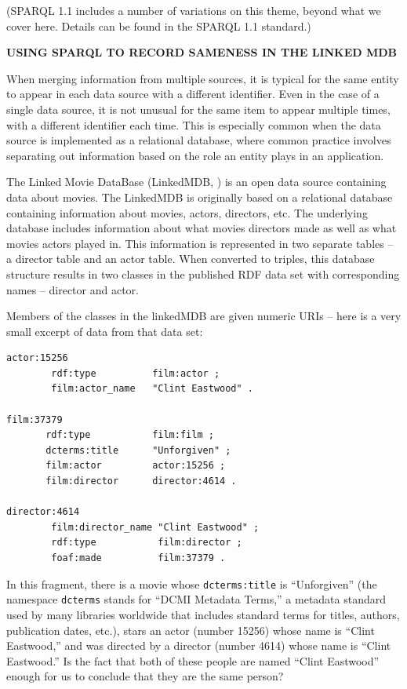 (SPARQL 1.1 includes a number of variations on this theme, beyond what
we cover here. Details can be found in the SPARQL 1.1 standard.)

\begin{challenge} 
\textbf{USING SPARQL TO RECORD SAMENESS IN THE LINKED MDB}
\label{chal:3}

When merging information from multiple sources, it is typical for the
same entity to appear in each data source with a different identifier.
Even in the case of a single data source, it is not unusual for the same
item to appear multiple times, with a different identifier each time.
This is especially common when the data source is implemented as a
relational database, where common practice involves separating out
information based on the role an entity plays in an application.

The Linked Movie DataBase (LinkedMDB, \cite{lmdatabase}) is an open data source containing
data about movies. The LinkedMDB is originally based on a relational database
containing information about movies, actors, directors, etc. The
underlying database includes information about what movies directors
made as well as what movies actors played in. This information is
represented in two separate tables -- a director table and an actor
table. When converted to triples, this database structure results in two
classes in the published RDF data set with corresponding names --
director and actor.

Members of the classes in the linkedMDB are given numeric URIs -- here
is a very small excerpt of data from that data set:

\begin{lstlisting}
actor:15256 
        rdf:type          film:actor ;
        film:actor_name   "Clint Eastwood" .

film:37379
       rdf:type           film:film ;
       dcterms:title      "Unforgiven" ;
       film:actor         actor:15256 ;
       film:director      director:4614 .

director:4614  
        film:director_name "Clint Eastwood" ;
        rdf:type           film:director ;
        foaf:made          film:37379 .

\end{lstlisting}

In this fragment, there is a movie whose \texttt{dcterms:title} is ``Unforgiven'' (the
namespace \texttt{dcterms} stands for ``DCMI Metadata Terms,'' a metadata standard used by
many libraries worldwide that includes standard terms for titles,
authors, publication dates, etc.), stars an actor (number 15256) whose
name is ``Clint Eastwood,'' and was directed by a director (number 4614)
whose name is ``Clint Eastwood.'' Is the fact that both of these people
are named ``Clint Eastwood'' enough for us to conclude that they are the
same person?


\end{challenge}

